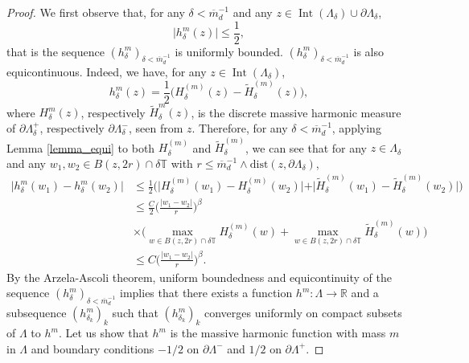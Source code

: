 \documentclass{article}
\theoremstyle{definition}
\theoremstyle{remark}
\theoremstyle{remark}
\begin{document}
\begin{proof}
We first observe that, for any $\delta < \overline{m}_{d}^{-1}$ and any $z \in \operatorname{Int}(\Lambda_{\delta}) \cup \partial \Lambda_{\delta}$,
\begin{equation*}
    \vert h_{\delta}^m (z) \vert \leq \frac{1}{2},
\end{equation*}
that is the sequence $(h_{\delta}^m)_{\delta < \overline{m}_{d}^{-1}}$ is uniformly bounded. $(h_{\delta}^m)_{\delta < \overline{m}_{d}^{-1}}$ is also equicontinuous. Indeed, we have, for any $z \in \operatorname{Int}(\Lambda_{\delta})$,
\begin{equation*}
    h_{\delta}^m(z) = \frac{1}{2}\bigg( H_{\delta}^{(m)} (z) - \tilde H_{\delta}^{(m)} (z)\bigg),
\end{equation*}
where $H_{\delta}^m(z)$, respectively $\tilde H_{\delta}^m(z)$, is the discrete massive harmonic measure of $\partial \Lambda_{\delta}^{+}$, respectively $\partial \Lambda_{\delta}^{-}$, seen from $z$. Therefore, for any $\delta < \overline{m}_d^{-1}$, applying Lemma \ref{lemma_equi} to both $H_{\delta}^{(m)}$ and $\tilde H_{\delta}^{(m)}$, we can see that for any $z \in \Lambda_{\delta}$ and any $w_1, w_2 \in B(z,2r) \cap \delta \mathbb{T}$ with $r \leq \overline{m}_{d}^{-1} \wedge \text{dist}(z, \partial \Lambda_{\delta})$,
\begin{align*}
    \vert h_{\delta}^m(w_1) - h_{\delta}^m(w_2) \vert &\leq \frac{1}{2} \bigg( \vert H_{\delta}^{(m)}(w_1) - H_{\delta}^{(m)}(w_2)\vert + \vert \tilde H_{\delta}^{(m)}(w_1) -\tilde H_{\delta}^{(m)}(w_2)\vert \bigg) \\
    &\leq \frac{C}{2} \bigg(\frac{\vert w_1 - w_2 \vert}{r} \bigg)^\beta \\
    & \times \bigg(\max_{w \in B(z,2r) \cap \delta \mathbb{T}} H_{\delta}^{(m)}(w) + \max_{w \in B(z,2r) \cap \delta \mathbb{T}} \tilde H_{\delta}^{(m)}(w) \bigg) \\
    &\leq C \bigg(\frac{\vert w_1 -  w_2 \vert}{r}\bigg)^\beta.
\end{align*}
By the Arzela-Ascoli theorem, uniform boundedness and equicontinuity of the sequence $(h_{\delta}^m)_{\delta < \overline{m}_{d}^{-1}}$ implies that there exists a function $h^m: \Lambda \to \mathbb{R}$ and a subsequence $(h_{\delta_k}^m)_k$ such that  $(h_{\delta_k}^m)_k$ converges uniformly on compact subsets of $\Lambda$ to $h^m$. Let us show that $h^m$ is the massive harmonic function with mass $m$ in $\Lambda$ and boundary conditions $-1/2$ on $\partial \Lambda^{-}$ and $1/2$ on $\partial \Lambda^{+}$. 


\end{proof}
\end{document}
